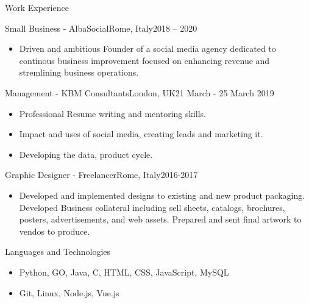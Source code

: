 \documentclass[]{mcdowellcv}
\begin{document}
	\begin{cvsection}{Work Experience}
		\begin{cvsubsection}{Small Business - AlbaSocial}{Rome, Italy}{2018 – 2020}
			\begin{itemize}
            \item Driven and ambitious Founder of a social media agency dedicated to continous business improvement focused on enhancing revenue and stremlining business operations.
			\end{itemize}
		\end{cvsubsection}
		
		\begin{cvsubsection}{Management - KBM Consultants}{London, UK}{21 March - 25 March 2019}	
			\begin{itemize}
            	\item Professional Resume writing and mentoring skills.
				\item Impact and uses of social media, creating leads and marketing it.
                \item Developing the data, product cycle.
			\end{itemize}
		\end{cvsubsection}

		\begin{cvsubsection}{Graphic Designer - Freelancer}{Rome, Italy}{2016-2017}	
			\begin{itemize}
            	\item Developed and implemented designs to existing and new product packaging. Developed Business collateral including sell sheets, catalogs, brochures, posters, advertisements, and web assets. Prepared and sent final artwork to vendos to produce.
			\end{itemize}
		\end{cvsubsection}

	\end{cvsection}

\begin{cvsection}{Languages and Technologies}
		\begin{cvsubsection}{}{}{}	
			\begin{itemize}
				\item Python, GO, Java, C, HTML, CSS, JavaScript, MySQL
				\item Git, Linux, Node.js, Vue.js
			\end{itemize}
		\end{cvsubsection}
	\end{cvsection}
	
\end{document}
